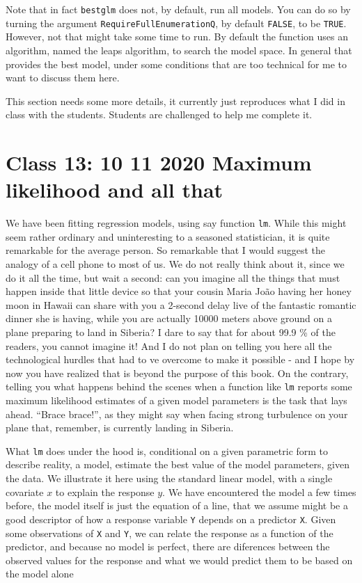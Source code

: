 \documentclass[
]{book}
\begin{document}
Note that in fact \texttt{bestglm} does not, by default, run all models. You can do so by turning the argument \texttt{RequireFullEnumerationQ}, by default \texttt{FALSE}, to be \texttt{TRUE}. However, not that might take some time to run. By default the function uses an algorithm, named the leaps algorithm, to search the model space. In general that provides the best model, under some conditions that are too technical for me to want to discuss them here.

This section needs some more details, it currently just reproduces what I did in class with the students. Students are challenged to help me complete it.

\chapter{Class 13: 10 11 2020 Maximum likelihood and all that}\label{MLEs}

We have been fitting regression models, using say function \texttt{lm}. While this might seem rather ordinary and uninteresting to a seasoned statistician, it is quite remarkable for the average person. So remarkable that I would suggest the analogy of a cell phone to most of us. We do not really think about it, since we do it all the time, but wait a second: can you imagine all the things that must happen inside that little device so that your cousin Maria João having her honey moon in Hawaii can share with you a 2-second delay live of the fantastic romantic dinner she is having, while you are actually 10000 meters above ground on a plane preparing to land in Siberia? I dare to say that for about 99.9 \% of the readers, you cannot imagine it! And I do not plan on telling you here all the technological hurdles that had to ve overcome to make it possible - and I hope by now you have realized that is beyond the purpose of this book. On the contrary, telling you what happens behind the scenes when a function like \texttt{lm} reports some maximum likelihood estimates of a given model parameters is the task that lays ahead. ``Brace brace!'', as they might say when facing strong turbulence on your plane that, remember, is currently landing in Siberia.

What \texttt{lm} does under the hood is, conditional on a given parametric form to describe reality, a model, estimate the best value of the model parameters, given the data. We illustrate it here using the standard linear model, with a single covariate \(x\) to explain the response \(y\). We have encountered the model a few times before, the model itself is just the equation of a line, that we assume might be a good descriptor of how a response variable \texttt{Y} depends on a predictor \texttt{X}. Given some observations of \texttt{X} and \texttt{Y}, we can relate the response as a function of the predictor, and because no model is perfect, there are diferences between the observed values for the response and what we would predict them to be based on the model alone
\end{document}
